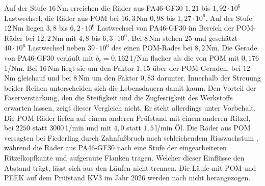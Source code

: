 Auf der Stufe $16$\,Nm erreichen die Räder aus PA46-GF30 $1{,}21$ bis $1{,}92 \cdot 10^{6}$ Lastwechsel, die Räder aus POM bei $16{,}3$\,Nm $0{,}98$ bis $1{,}27 \cdot 10^{6}$. Auf der Stufe $12$\,Nm liegen $3{,}8$ bis $6{,}2 \cdot 10^{6}$ Lastwechsel von PA46-GF30 im Bereich der POM-Räder bei $12{,}2$\,Nm mit $4{,}8$ bis $6{,}3 \cdot 10^{6}$. Bei $8$\,Nm stehen $25$ und geschätzt $40 \cdot 10^{6}$ Lastwechsel neben $39 \cdot 10^{6}$ des einen POM-Rades bei $8{,}2$\,Nm. Die Gerade von PA46-GF30 verläuft mit $b_{\mathrm{c}} = 0{,}162$\,1/Nm flacher als die von POM mit $0{,}176$\,1/Nm. Bei $16$\,Nm liegt sie um den Faktor $1{,}15$ über der POM-Geraden, bei $12$\,Nm gleichauf und bei $8$\,Nm um den Faktor $0{,}83$ darunter. Innerhalb der Streuung beider Reihen unterscheiden sich die Lebensdauern damit kaum. Den Vorteil der Faserverstärkung, den die Steifigkeit und die Zugfestigkeit des Werkstoffs erwarten lassen, zeigt dieser Vergleich nicht. Er steht allerdings unter Vorbehalt. Die POM-Räder liefen auf einem anderen Prüfstand mit einem anderen Ritzel, bei $2250$ statt $3000$\,1/min und mit $4{,}0$ statt $1{,}5$\,l/min Öl. Die Räder aus POM versagten bei Fiederling durch Zahnfußbruch nach schleichendem Risswachstum \cite[S.~66]{Fie23}, während die Räder aus PA46-GF30 nach  eine Stufe der eingearbeiteten Ritzelkopfkante und aufgeraute Flanken tragen. Welcher dieser Einflüsse den Abstand trägt, lässt sich aus den Läufen nicht trennen. Die Läufe mit POM und PEEK auf dem Prüfstand KV3 im Jahr 2026 werden nach  nicht herangezogen.


